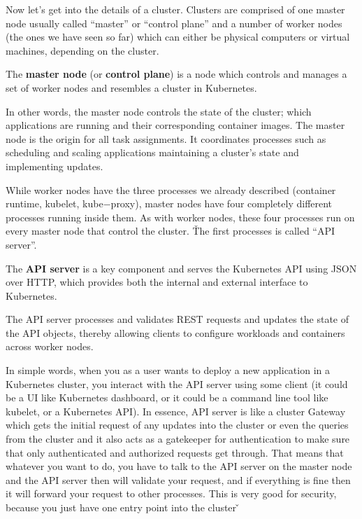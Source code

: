 Now let's get into the details of a cluster. Clusters are comprised of one master node usually called ``master'' or
``control plane'' and a number of worker nodes (the ones we have seen so far) which can either be physical computers
or virtual machines, depending on the cluster.

The \textbf{master node} (or \textbf{control plane}) is a node which controls and manages a set of worker nodes and
resembles a cluster in Kubernetes.
\ed

In other words, the master node controls the state of the cluster; which applications are running and their
corresponding container images. The master node is the origin for all task assignments. It coordinates processes such
as scheduling and scaling applications maintaining a cluster’s state and implementing updates.


While worker nodes have the three processes we already described (container runtime, kubelet, kube$-$proxy), master
nodes have four completely different processes running inside them. As with worker nodes, these four processes run on
every master node that control the cluster. \v

The first processes is called ``API server''.

The \textbf{API server} is a key component and serves the Kubernetes API using JSON over HTTP, which provides both the
internal and external interface to Kubernetes.
\ed

The API server processes and validates REST requests and updates the state of the API objects, thereby allowing
clients to configure workloads and containers across worker nodes.


In simple words, when you as a user wants to deploy a new application in a Kubernetes cluster, you interact with the
API server using some client (it could be a UI like Kubernetes dashboard, or it could be a command line tool like
kubelet, or a Kubernetes API). In essence, API server is like a cluster Gateway which gets the initial request of any
updates into the cluster or even the queries from the cluster and it also acts as a gatekeeper for authentication to
make sure that only authenticated and authorized requests get through. That means that whatever you want to do, you
have to talk to the API server on the master node and the API server then will validate your request, and if
everything is fine then it will forward your request to other processes. This is very good for security, because you
just have one entry point into the cluster \v

